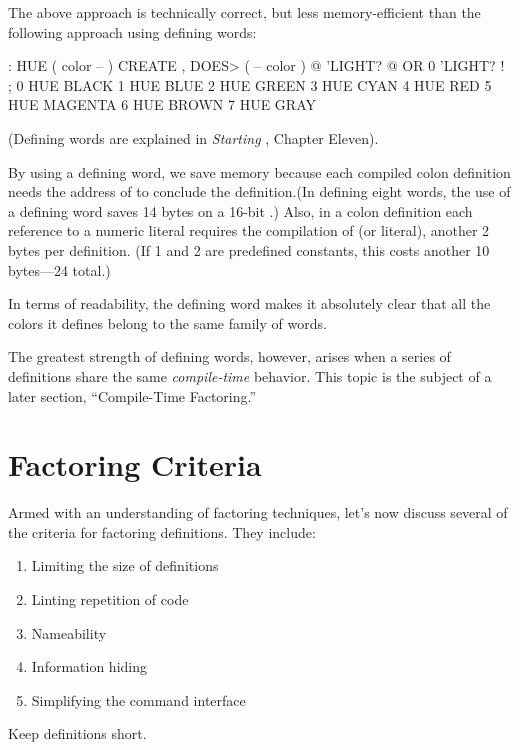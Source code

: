 \noindent The above approach is technically correct, but less
memory-efficient than the following approach using defining words:

\begin{Code}
: HUE   ( color -- )  CREATE ,
   DOES>  ( -- color )  @ 'LIGHT? @  OR  0 'LIGHT? ! ;
 0 HUE BLACK         1 HUE BLUE          2 HUE GREEN
 3 HUE CYAN          4 HUE RED           5 HUE MAGENTA
 6 HUE BROWN         7 HUE GRAY
\end{Code}
(Defining words are explained in \emph{Starting \Forth{}}, Chapter Eleven).

By using a defining word, we save memory because each compiled colon
definition needs the address of  to conclude the
definition.(In defining eight words, the use of a defining word saves
14 bytes on a 16-bit \Forth{}.) Also, in a colon definition each
reference to a numeric literal requires the compilation of
 (or literal), another 2 bytes per definition. (If 1 and 2
are predefined constants, this costs another 10 bytes---24 total.)

In terms of readability, the defining word makes it absolutely clear
that all the colors it defines belong to the same family of words.

The greatest strength of defining words, however, arises when a series
of definitions share the same \emph{compile-time} behavior. This topic
is the subject of a later section, ``Compile-Time Factoring.''

\section{Factoring Criteria}
Armed with an understanding of factoring techniques, let's now discuss
several of the criteria for factoring \Forth{} definitions. They
include:

\begin{enumerate}
\item Limiting the size of definitions
\item Linting repetition of code
\item Nameability
\item Information hiding
\item Simplifying the command interface
\end{enumerate}

\begin{tip}
Keep definitions short.
\end{tip}

